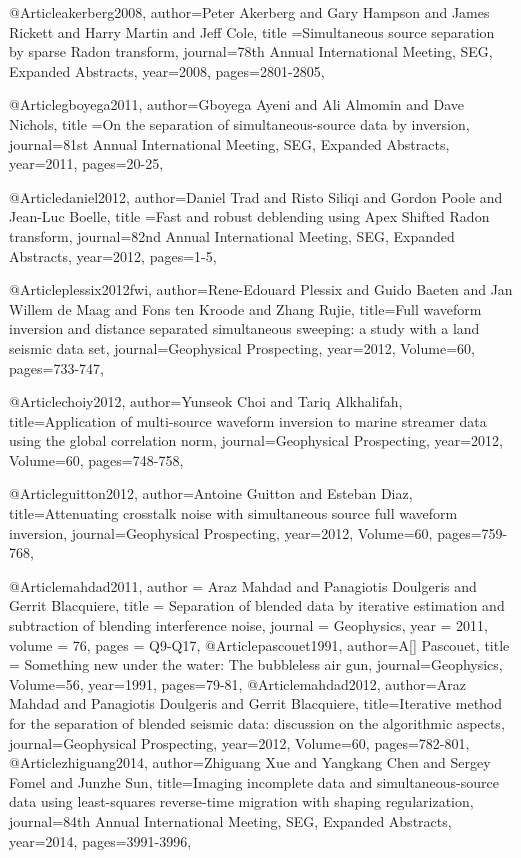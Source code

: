 {@Article{akerberg2008,
  author={Peter Akerberg and Gary Hampson and James Rickett and Harry Martin and Jeff Cole},
  title ={Simultaneous source separation by sparse Radon transform},
  journal={78th Annual International Meeting, SEG, Expanded Abstracts},
  year=2008,
  pages={2801-2805},
}

@Article{gboyega2011,
  author={Gboyega Ayeni and Ali Almomin and Dave Nichols},
  title ={On the separation of simultaneous-source data by inversion},
  journal={81st Annual International Meeting, SEG, Expanded Abstracts},
  year=2011,
  pages={20-25},
}

@Article{daniel2012,
  author={Daniel Trad and Risto Siliqi and Gordon Poole and Jean-Luc Boelle},
  title ={Fast and robust deblending using Apex Shifted Radon transform},
  journal={82nd Annual International Meeting, SEG, Expanded Abstracts},
  year=2012,
  pages={1-5},
}

@Article{plessix2012fwi,
  author={Rene-Edouard Plessix and Guido Baeten and Jan Willem de Maag and Fons ten Kroode and Zhang Rujie},
  title={Full waveform inversion and distance separated simultaneous sweeping: a study with a land seismic data set},
  journal={Geophysical Prospecting},
  year=2012,
  Volume=60,
  pages={733-747},
}

@Article{choiy2012,
  author={Yunseok Choi and Tariq Alkhalifah},
  title={Application of multi-source waveform inversion to marine streamer data using the global correlation norm},
  journal={Geophysical Prospecting},
  year=2012,
  Volume=60,
  pages={748-758},
}


@Article{guitton2012,
  author={Antoine Guitton and Esteban Diaz},
  title={Attenuating crosstalk noise with simultaneous source full waveform inversion},
  journal={Geophysical Prospecting},
  year=2012,
  Volume=60,
  pages={759-768},
}

@Article{mahdad2011,
  author = 	 {Araz Mahdad and Panagiotis Doulgeris and Gerrit Blacquiere},
  title = 	 {Separation of blended data by iterative estimation and subtraction of blending interference noise},
  journal = 	 {Geophysics},
  year = 	 2011,
  volume =	 76,
  pages =	 {Q9-Q17},
}
@Article{pascouet1991,
  author={A[] Pascouet},
  title = {Something new under the water: The bubbleless air gun},
  journal={Geophysics},
  Volume=56,
  year=1991,
  pages={79-81},
}
@Article{mahdad2012,
  author={Araz Mahdad and Panagiotis Doulgeris and Gerrit Blacquiere},
  title={Iterative method for the separation of blended seismic data: discussion on the algorithmic aspects},
  journal={Geophysical Prospecting},
  year=2012,
  Volume=60,
  pages={782-801},
}
@Article{zhiguang2014,
  author={Zhiguang Xue and Yangkang Chen and Sergey Fomel and Junzhe Sun},
  title={Imaging incomplete data and simultaneous-source data using least-squares reverse-time migration
with shaping regularization},
  journal={84th Annual International Meeting, SEG, Expanded Abstracts},
  year=2014,
  pages={3991-3996},
}



}
